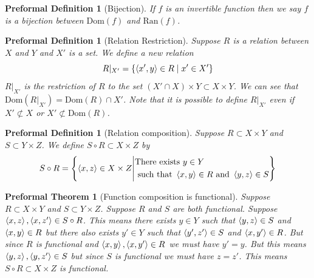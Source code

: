 \documentclass[oneside, 12pt]{book}
\theoremstyle{break}
\newtheorem{preformal definition}[definition]{Preformal Definition}
\newtheorem{preformal theorem}[theorem]{Preformal Theorem}
\begin{document}
			\begin{preformal definition}[Bijection]
				If $f$ is an invertible function then we say $f$ is a bijection between $\text{Dom}(f)$ and $\text{Ran}(f)$.
			\end{preformal definition}
			
			\begin{preformal definition}[Relation Restriction]
				Suppose $R$ is a relation between $X$ and $Y$ and $X'$ is a set.
				We define a new relation
				$$
				R|_{X'} = \{\braket{x', y} \in R \mid x' \in X'\}
				$$
				$R|_{X'}$ is the restriction of $R$ to the set $(X'\cap X) \times Y \subset X \times Y$.
				We can see that $\text{Dom}(R|_{X'}) = \text{Dom}(R) \cap X'$.
				Note that it is possible to define $R|_{X'}$ even if $X' \not\subset X$ or $X' \not\subset \text{Dom}(R)$.
			\end{preformal definition}
			
			\begin{preformal definition}[Relation composition]
				Suppose $R \subset X \times Y$ and $S \subset Y \times Z$.
				We define $S \circ R \subset X \times Z$ by
				\begin{equation*}
					S\circ R = \left\{\braket{x, z} \in X \times Z \middle| \begin{aligned}
						&\text{There exists } y \in Y\\
						&\text{ such that } \braket{x, y} \in R \text{ and } \braket{y, z} \in S
					\end{aligned}\right\}
				\end{equation*}
			\end{preformal definition}
			
			\begin{preformal theorem}[Function composition is functional]
				\label{thm:function composition is functional}
				Suppose $R \subset X \times Y$ and $S\subset Y \times Z$.
				Suppose $R$ and $S$ are both functional.
				Suppose $\braket{x, z}, \braket{x, z'} \in S \circ R$.
				This means there exists $y \in Y$ such that $\braket{y, z} \in S$ and $\braket{x, y} \in R$ but there also exists $y' \in Y$ such that $\braket{y', z'} \in S$ and $\braket{x, y'} \in R$.
				But since $R$ is functional and $\braket{x, y},  \braket{x, y'} \in R$ we must have $y'= y$.
				But this means $\braket{y, z}, \braket{y, z'} \in S$ but since $S$ is functional we must have $z=z'$.
				This means $S \circ R \subset X \times Z$ is functional.
			\end{preformal theorem}
			
\end{document}
